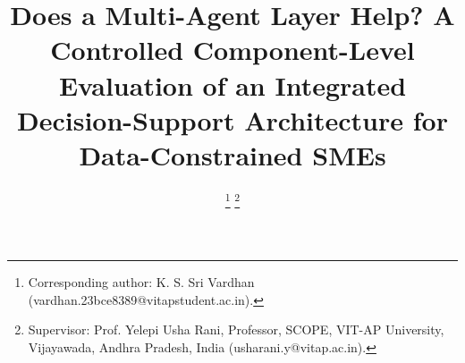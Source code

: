 \documentclass[conference]{IEEEtran}
\begin{document}
\title{Does a Multi-Agent Layer Help? A Controlled Component-Level Evaluation of
an Integrated Decision-Support Architecture for Data-Constrained SMEs}

%
\author{%
\thanks{Corresponding author: K. S. Sri Vardhan
(vardhan.23bce8389@vitapstudent.ac.in).}
\thanks{Supervisor: Prof. Yelepi Usha Rani, Professor, SCOPE, VIT-AP University,
Vijayawada, Andhra Pradesh, India (usharani.y@vitap.ac.in).}
}

\maketitle
\end{document}
